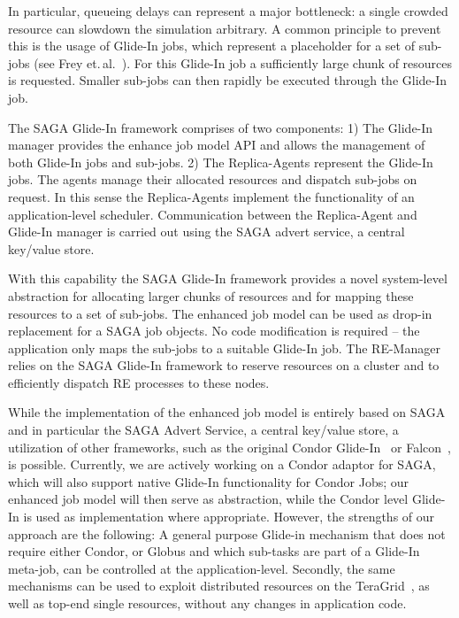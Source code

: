 \documentclass[conference,final]{IEEEtran}
\begin{document}
In particular, queueing delays can represent a major bottleneck: a
single crowded resource can slowdown the simulation arbitrary. A
common principle to prevent this is the usage of Glide-In jobs, which
represent a placeholder for a set of sub-jobs (see Frey
et.\,al.~\cite{citeulike:291860}).  For this Glide-In job a
sufficiently large chunk of resources is requested. Smaller sub-jobs
can then rapidly be executed through the Glide-In job.

The SAGA Glide-In framework comprises of two components: 1) The
Glide-In manager provides the enhance job model API and allows the
management of both Glide-In jobs and sub-jobs.  2) The Replica-Agents
represent the Glide-In jobs. The agents manage their allocated
resources and dispatch sub-jobs on request. In this sense the
Replica-Agents implement the functionality of an application-level
scheduler. Communication between the Replica-Agent and Glide-In
manager is carried out using the SAGA advert service, a central
key/value store.

With this capability the SAGA Glide-In framework provides a novel
system-level abstraction for allocating larger chunks of resources and
for mapping these resources to a set of sub-jobs. The enhanced job
model can be used as drop-in replacement for a SAGA job objects. No
code modification is required -- the application only maps the
sub-jobs to a suitable Glide-In job.  The RE-Manager relies on the
SAGA Glide-In framework to reserve resources on a cluster and to
efficiently dispatch RE processes to these nodes.

While the implementation of the enhanced job model is entirely based
on SAGA and in particular the SAGA Advert Service, a central key/value
store, a utilization of other frameworks, such as the original Condor
Glide-In~\cite{citeulike:291860} or Falcon~\cite{1362680}, is
possible. Currently, we are actively working on a Condor adaptor for
SAGA, which will also support native Glide-In functionality for Condor
Jobs; our enhanced job model will then serve as abstraction, while the
Condor level Glide-In is used as implementation where appropriate.
However, the strengths of our approach are the following: A general
purpose Glide-in mechanism that does not require either Condor, or
Globus and which sub-tasks are part of a Glide-In meta-job, can be
controlled at the application-level. Secondly, the same mechanisms can
be used to exploit distributed resources on the
TeraGrid~\cite{repex_ptrsa}, as well as top-end single resources,
without any changes in application code.
\end{document}
